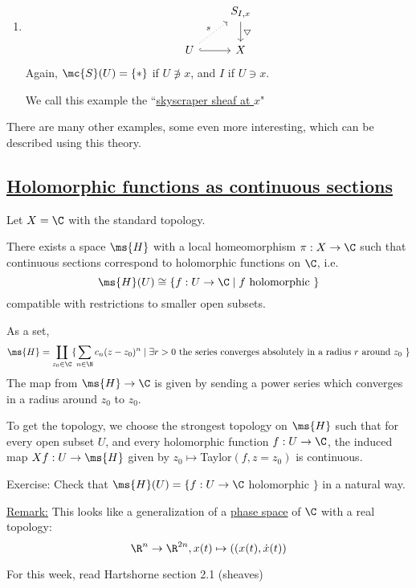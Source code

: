 \documentclass[x11names,reqno,14pt]{extarticle}
\begin{document}
\begin{enumerate}
\item 
\[
\begin{tikzcd}
& S_{I,x} \ar[d, "\bigtriangledown"] \\
U \ar[ur,dotted,"s"] \ar[r,hook] & X 
\end{tikzcd}
\]
Again, $\mc{S}(U) = \{*\}$ if $U \not\ni x$, and $I$ if $U \ni x$. 

We call this example the ``\underline{skyscraper sheaf at $x$}"

\end{enumerate}

There are many other examples, some even more interesting, which can be described using this theory.

\subsection*{\underline{Holomorphic functions as continuous sections}}

Let $X = \C$ with the standard topology. 

\claim

There exists a space $\ms{H}$ with a local homeomorphism $\pi:X\to\C$ such that continuous sections correspond to holomorphic functions on $\C$, i.e. 
\[
\ms{H}(U) \cong \{f:U\to \C \mid f\text{ holomorphic }\}
\]
compatible with restrictions to smaller open subsets. 

\proof

As a set, 
\[
\ms{H} = \coprod_{z_0\in\C}\{\sum_{n\in\N}c_n(z - z_0)^n \mid \exists r > 0 \text{ the series converges absolutely in a radius $r$ around $z_0$ }\}
\]
The map from $\ms{H}\to\C$ is given by sending a power series which converges in a radius around $z_0$ to $z_0$. 

To get the topology, we choose the strongest topology on $\ms{H}$ such that for every open subset $U$, and every holomorphic function $f:U\to\C$, the induced map $Xf:U\to \ms{H}$ given by $z_0 \mapsto $Taylor$(f, z = z_0)$ is continuous. 

Exercise: Check that $\ms{H}(U) = \{f:U\to \C$ holomorphic $\}$ in a natural way. 

\underline{Remark:} This looks like a generalization of a \underline{phase space} of $\C$ with a real topology:
\[
\R^n \to \R^{2n}, x(t) \mapsto ((x(t), \dot{x}(t))
\]

For this week, read Hartshorne section 2.1 (sheaves)
\end{document}
